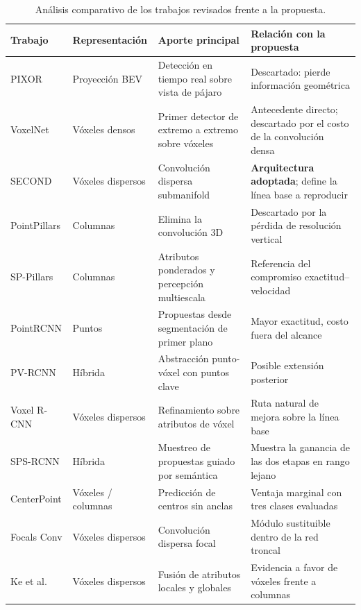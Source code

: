 \documentclass[11pt,letterpaper]{article}
\begin{document}
\begin{table}[htbp]
\caption{Análisis comparativo de los trabajos revisados frente a la propuesta.}
\label{tab:comparativa}
\centering
\footnotesize
\renewcommand{\arraystretch}{1.15}
\begin{tabular}{@{}>{\raggedright\arraybackslash}p{2.6cm}>{\raggedright\arraybackslash}p{2.1cm}>{\raggedright\arraybackslash}p{4.6cm}>{\raggedright\arraybackslash}p{6.1cm}@{}}
\toprule
\textbf{Trabajo} & \textbf{Representación} & \textbf{Aporte principal} & \textbf{Relación con la propuesta} \\
\midrule
PIXOR \cite{yang2018} & Proyección BEV & Detección en tiempo real sobre vista de pájaro & Descartado: pierde información geométrica \\
VoxelNet \cite{zhou2018} & Vóxeles densos & Primer detector de extremo a extremo sobre vóxeles & Antecedente directo; descartado por el costo de la convolución densa \\
SECOND \cite{yan2018} & Vóxeles dispersos & Convolución dispersa submanifold & \textbf{Arquitectura adoptada}; define la línea base a reproducir \\
PointPillars \cite{lang2019} & Columnas & Elimina la convolución 3D & Descartado por la pérdida de resolución vertical \\
SP-Pillars \cite{chen2025sp} & Columnas & Atributos ponderados y percepción multiescala & Referencia del compromiso exactitud--velocidad \\
PointRCNN \cite{shi2019} & Puntos & Propuestas desde segmentación de primer plano & Mayor exactitud, costo fuera del alcance \\
PV-RCNN \cite{shi2020} & Híbrida & Abstracción punto-vóxel con puntos clave & Posible extensión posterior \\
Voxel R-CNN \cite{deng2021} & Vóxeles dispersos & Refinamiento sobre atributos de vóxel & Ruta natural de mejora sobre la línea base \\
SPS-RCNN \cite{xu2025} & Híbrida & Muestreo de propuestas guiado por semántica & Muestra la ganancia de las dos etapas en rango lejano \\
CenterPoint \cite{yin2021} & Vóxeles / columnas & Predicción de centros sin anclas & Ventaja marginal con tres clases evaluadas \\
Focals Conv \cite{chen2022b} & Vóxeles dispersos & Convolución dispersa focal & Módulo sustituible dentro de la red troncal \\
Ke et al.\ \cite{ke2025} & Vóxeles dispersos & Fusión de atributos locales y globales & Evidencia a favor de vóxeles frente a columnas \\

\end{tabular}
\end{table}
\end{document}
